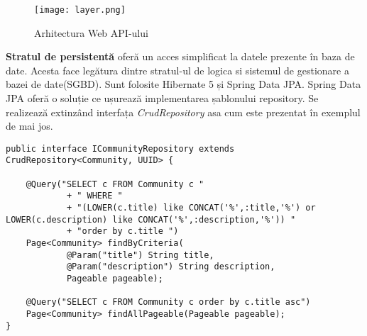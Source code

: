 \begin{figure}[h]
\texttt{[image: layer.png]}
\centering
\caption{Arhitectura Web API-ului}
\label{fig:layer}
\end{figure}    

\textbf{Stratul de persistentă} oferă un acces simplificat la datele prezente
în baza de date. Acesta face legătura dintre stratul-ul de logica si sistemul de gestionare a bazei de
date(SGBD). Sunt folosite Hibernate 5 și Spring Data JPA. Spring Data JPA oferă o soluție ce ușurează 
implementarea șablonului repository. Se realizează extinzând interfața \textit{CrudRepository} asa cum 
este prezentat în exemplul de mai jos.

\begin {lstlisting}
public interface ICommunityRepository extends CrudRepository<Community, UUID> {

	@Query("SELECT c FROM Community c "
			+ " WHERE " 
			+ "(LOWER(c.title) like CONCAT('%
			+ "order by c.title ")
	Page<Community> findByCriteria(
			@Param("title") String title, 
			@Param("description") String description,
			Pageable pageable);
	
	@Query("SELECT c FROM Community c order by c.title asc")
	Page<Community> findAllPageable(Pageable pageable);
}
\end{lstlisting}

